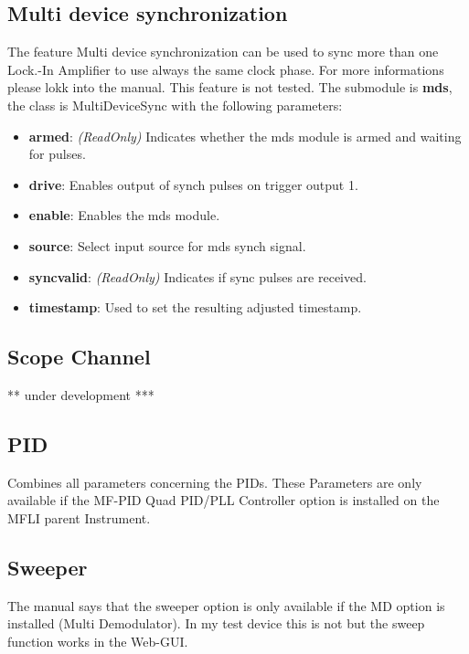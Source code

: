 \documentclass[11pt]{article} %
\begin{document}
\subsection{Multi device synchronization}
The feature Multi device synchronization can be used to sync more than one Lock.-In Amplifier to use always the same clock phase. For more informations please lokk into the manual. This feature is not tested. The submodule is {\bf mds}, the class is MultiDeviceSync with the following parameters:
\begin{itemize}
\item {\bf armed}: {\it (ReadOnly)} Indicates whether the mds module is armed and waiting for pulses.
\item {\bf drive}: Enables output of synch pulses on trigger output 1.
\item {\bf enable}: Enables the mds module.
\item {\bf source}: Select input source for mds synch signal.
\item {\bf syncvalid}: {\it (ReadOnly)} Indicates if sync pulses are received.
\item {\bf timestamp}: Used to set the resulting adjusted timestamp.
\end{itemize}


\subsection{Scope Channel}
        ** under development ***


\subsection{PID}
    Combines all parameters concerning the PIDs.
    These Parameters are only available if the MF-PID Quad PID/PLL Controller 
    option is installed on the MFLI parent Instrument.


\subsection{Sweeper}
The manual says that the sweeper option is only available if the MD option is installed (Multi Demodulator). In my test device this is not but the sweep function works in the Web-GUI.
\end{document}
